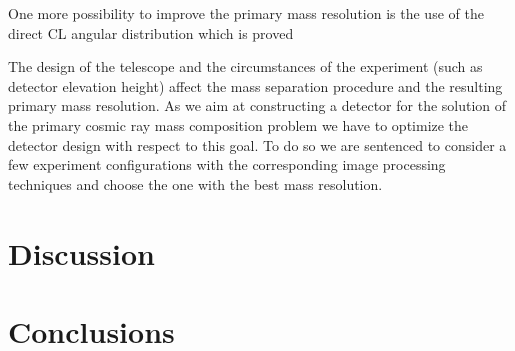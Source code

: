 \documentclass[a4paper,11pt]{article}
\begin{document}
One more possibility to improve the primary mass resolution is the use of the direct CL angular distribution which is proved 

The design of the telescope and the circumstances of the experiment (such as detector elevation height) affect the mass separation procedure and the resulting primary mass resolution. As we aim at constructing a detector for the solution of the primary cosmic ray mass composition problem we have to optimize the detector design with respect to this goal. To do so we are sentenced to consider a few experiment configurations with the corresponding image processing techniques and choose the one with the best mass resolution.


\section{Discussion}

\section{Conclusions}

\acknowledgments
{}



\end{document}
